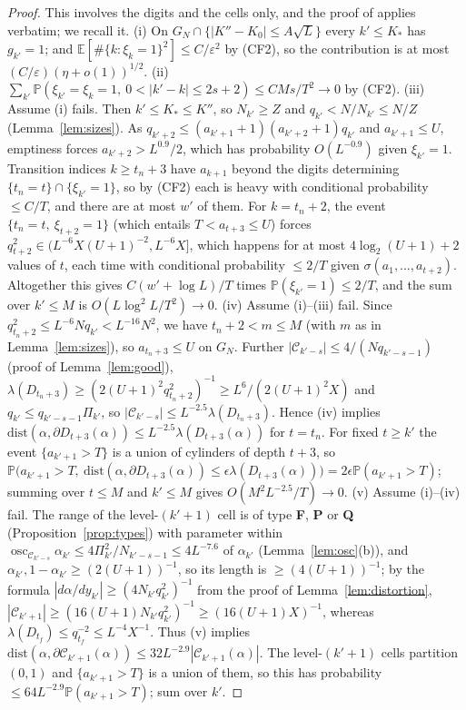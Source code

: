 \documentclass[11pt]{amsart}
\theoremstyle{definition}
\numberwithin{equation}{section}
\newcommand{\E}{\mathbb{E}}
\newcommand{\Prob}{\mathbb{P}}
\newcommand{\cC}{\mathcal{C}}
\newcommand{\eps}{\varepsilon}
\DeclareMathOperator{\osc}{osc}
\begin{document}
\begin{proof}
This involves the digits and the cells only, and the proof of \cite[Lemma~8.3]{E1002} applies verbatim; we recall it.
(i) On $G_N\cap\{|K''-K_0|\le A\sqrt L\}$ every $k'\le K_*$ has $g_{k'}=1$; and $\E[\#\{k:\xi_k=1\}^2]\le C/\eps^2$ by (CF2), so the contribution is
at most $(C/\eps)(\eta+o(1))^{1/2}$.
(ii) $\sum_{k'}\Prob(\xi_{k'}=\xi_k=1,\ 0<|k'-k|\le2s+2)\le CMs/T^2\to0$ by (CF2).
(iii) Assume (i) fails. Then $k'\le K_*\le K''$, so $N_{k'}\ge Z$ and $q_{k'}<N/N_{k'}\le N/Z$ (Lemma~\ref{lem:sizes}). As
$q_{k'+2}\le(a_{k'+1}+1)(a_{k'+2}+1)q_{k'}$ and $a_{k'+1}\le U$, emptiness forces $a_{k'+2}>L^{0.9}/2$, which has probability $O(L^{-0.9})$ given $\xi_{k'}=1$. Transition indices
$k\ge t_n+3$ have $a_{k+1}$ beyond the digits determining $\{t_n=t\}\cap\{\xi_{k'}=1\}$, so by
(CF2) each is heavy with conditional probability $\le C/T$, and there are at most $w'$ of them. For $k=t_n+2$, the event
$\{t_n=t,\ \xi_{t+2}=1\}$ (which entails $T<a_{t+3}\le U$) forces $q_{t+2}^2\in(L^{-6}X(U+1)^{-2},L^{-6}X]$, which happens for at most $4\log_2(U+1)+2$ values of $t$,
each time with conditional probability $\le2/T$ given $\sigma(a_1,\dots,a_{t+2})$. Altogether this gives $C(w'+\log L)/T$ times $\Prob(\xi_{k'}=1)\le2/T$, and the
sum over $k'\le M$ is $O(L\log^2L/T^2)\to0$.
(iv) Assume (i)--(iii) fail. Since $q_{t_n+2}^2\le L^{-6}Nq_{k'}<L^{-16}N^2$, we have $t_n+2<m\le M$ (with $m$ as in Lemma~\ref{lem:sizes}),
so $a_{t_n+3}\le U$ on $G_N$. Further $|\cC_{k'-s}|\le4/(Nq_{k'-s-1})$ (proof of Lemma~\ref{lem:good}),
$\lambda(D_{t_n+3})\ge(2(U+1)^2q_{t_n+2}^2)^{-1}\ge L^6/(2(U+1)^2X)$ and $q_{k'}\le q_{k'-s-1}\Pi_{k'}$, so $|\cC_{k'-s}|\le L^{-2.5}\lambda(D_{t_n+3})$.
Hence (iv) implies $\mathrm{dist}(\alpha,\partial D_{t+3}(\alpha))\le L^{-2.5}\lambda(D_{t+3}(\alpha))$ for $t=t_n$. For fixed $t\ge k'$ the event
$\{a_{k'+1}>T\}$ is a union of cylinders of depth $t+3$, so
$\Prob\big(a_{k'+1}>T,\ \mathrm{dist}(\alpha,\partial D_{t+3}(\alpha))\le\epsilon\lambda(D_{t+3}(\alpha))\big)=2\epsilon\Prob(a_{k'+1}>T)$; summing over
$t\le M$ and $k'\le M$ gives $O(M^2L^{-2.5}/T)\to0$.
(v) Assume (i)--(iv) fail. The range of the level-$(k'+1)$ cell is of type \textbf F, \textbf P or \textbf Q (Proposition~\ref{prop:types}) with
parameter within $\osc_{\cC_{k'-s}}\alpha_{k'}\le4\Pi_{k'}^2/N_{k'-s-1}\le4L^{-7.6}$ of $\alpha_{k'}$ (Lemma~\ref{lem:osc}(b)), and
$\alpha_{k'},1-\alpha_{k'}\ge(2(U+1))^{-1}$, so its length is $\ge(4(U+1))^{-1}$; by the formula $|d\alpha/dy_{k'}|\ge(4N_{k'}q_{k'}^2)^{-1}$ from the
proof of Lemma~\ref{lem:distortion}, $|\cC_{k'+1}|\ge(16(U+1)N_{k'}q_{k'}^2)^{-1}\ge(16(U+1)X)^{-1}$, whereas $\lambda(D_{t_f})\le q_{t_f}^{-2}\le L^{-4}X^{-1}$. Thus (v) implies
$\mathrm{dist}(\alpha,\partial\cC_{k'+1}(\alpha))\le32L^{-2.9}|\cC_{k'+1}(\alpha)|$. The level-$(k'+1)$ cells partition $(0,1)$ and $\{a_{k'+1}>T\}$ is a
union of them, so this has probability $\le64L^{-2.9}\Prob(a_{k'+1}>T)$; sum over $k'$.
\end{proof}
\end{document}
